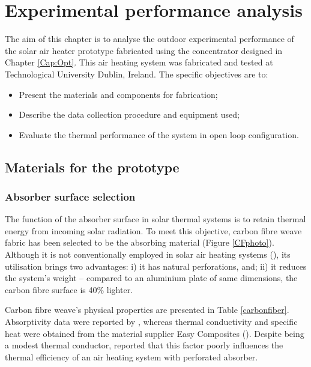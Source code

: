 \chapter{Experimental performance analysis}
\label{Cap:Exp}
%

The aim of this chapter is to analyse the outdoor experimental performance of the solar air heater prototype fabricated using the concentrator designed in Chapter \ref{Cap:Opt}. This air heating system was fabricated and tested at Technological University Dublin, Ireland. The specific objectives are to:

\begin{itemize}
	\item Present the materials and components for fabrication;
	\item Describe the data collection procedure and equipment used;
	\item Evaluate the thermal performance of the system in open loop configuration.
\end{itemize}

\section{Materials for the prototype}
	
\subsection{Absorber surface selection}

The function of the absorber surface in solar thermal systems is to retain thermal energy from incoming solar radiation. To meet this objective, carbon fibre weave fabric has been selected to be the absorbing material (Figure \ref{CFphoto}). Although it is not conventionally employed in solar air heating systems (\cite{Shams2013}), its utilisation brings two advantages: i) it has natural perforations, and; ii) it reduces the system's weight -- compared to an aluminium plate of same dimensions, the carbon fibre surface is 40\% lighter.


Carbon fibre weave's physical properties are presented in Table \ref{carbonfiber}. Absorptivity data were reported by \citet{Wu2012}, whereas thermal conductivity and specific heat were obtained from the material supplier Easy Composites (\cite{EasyComposites2017}). \mbox{Despite} being a modest thermal conductor, \citet{Gawlik2005} reported that this factor poorly influences the thermal efficiency of an air heating system with perforated absorber.

